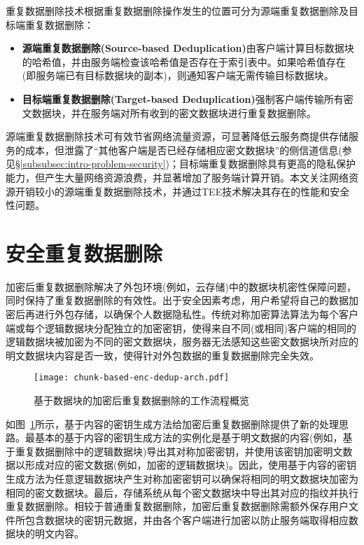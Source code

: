 重复数据删除技术根据重复数据删除操作发生的位置可分为源端重复数据删除及目标端重复数据删除\cite{IDC2010Data}：

\begin{itemize}[leftmargin=*]
    \item \textbf{源端重复数据删除(Source-based Deduplication)}由客户端计算目标数据块的哈希值，并由服务端检查该哈希值是否存在于索引表中。如果哈希值存在(即服务端已有目标数据块的副本)，则通知客户端无需传输目标数据块。
    \item \textbf{目标端重复数据删除(Target-based Deduplication)}强制客户端传输所有密文数据块，并在服务端对所有收到的密文数据块进行重复数据删除。
\end{itemize}

源端重复数据删除技术可有效节省网络流量资源，可显著降低云服务商提供存储服务的成本，但泄露了“其他客户端是否已经存储相应密文数据块”的侧信道信息(参见\S\ref{subsubsec:intro-problem-security})；目标端重复数据删除具有更高的隐私保护能力，但产生大量网络资源浪费，并显著增加了服务端计算开销。本文关注网络资源开销较小的源端重复数据删除技术，并通过TEE技术解决其存在的性能和安全性问题。

\section{安全重复数据删除}
\label{sec:background-enc-deduplication}

加密后重复数据删除解决了外包环境(例如，云存储)中的数据块机密性保障问题，同时保持了重复数据删除的有效性。出于安全因素考虑，用户希望将自己的数据加密后再进行外包存储，以确保个人数据隐私性。传统对称加密算法算法为每个客户端或每个逻辑数据块分配独立的加密密钥，使得来自不同(或相同)客户端的相同的逻辑数据块被加密为不同的密文数据块，服务器无法感知这些密文数据块所对应的明文数据块内容是否一致，使得针对外包数据的重复数据删除完全失效。

\begin{figure}[!htb]
    \small
    \centering
    \texttt{[image: chunk-based-enc-dedup-arch.pdf]}
    \caption{基于数据块的加密后重复数据删除的工作流程概览} 
    \label{fig:chunk-based-enc-dedup-flow}
\end{figure}

如图~\ref{fig:chunk-based-enc-dedup-flow}所示，基于内容的密钥生成方法给加密后重复数据删除提供了新的处理思路。最基本的基于内容的密钥生成方法的实例化是基于明文数据的内容(例如，基于重复数据删除中的逻辑数据块)导出其对称加密密钥，并使用该密钥加密明文数据以形成对应的密文数据(例如，加密的逻辑数据块)。因此，使用基于内容的密钥生成方法为任意逻辑数据块产生对称加密密钥可以确保将相同的明文数据块加密为相同的密文数据块。最后，存储系统从每个密文数据块中导出其对应的指纹并执行重复数据删除。相较于普通重复数据删除，加密后重复数据删除需额外保存用户文件所包含数据块的密钥元数据，并由各个客户端进行加密以防止服务端取得相应数据块的明文内容。

